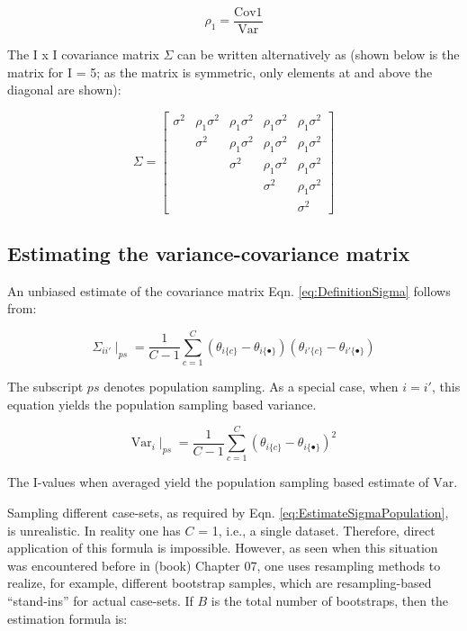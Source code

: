 \documentclass[
]{book}
\begin{document}
\[\rho_1=\frac{\text{Cov1}}{\text{Var}}\]

The I x I covariance matrix \(\Sigma\) can be written alternatively as (shown below is the matrix for I = 5; as the matrix is symmetric, only elements at and above the diagonal are shown):

\begin{equation}
\Sigma = 
\begin{bmatrix}
\sigma^2 & \rho_1\sigma^2 & \rho_1\sigma^2 & \rho_1\sigma^2 & \rho_1\sigma^2\\
& \sigma^2 & \rho_1\sigma^2 & \rho_1\sigma^2 & \rho_1\sigma^2\\
&  & \sigma^2 & \rho_1\sigma^2 & \rho_1\sigma^2\\
&  &  & \sigma^2 & \rho_1\sigma^2\\
&  &  &  & \sigma^2
\end{bmatrix}
\label{eq:CovMtrxSigmaRhoForm}
\end{equation}

\hypertarget{estimating-the-variance-covariance-matrix}{%
\subsection{Estimating the variance-covariance matrix}\label{estimating-the-variance-covariance-matrix}}

An unbiased estimate of the covariance matrix Eqn. \eqref{eq:DefinitionSigma} follows from:

\begin{equation}
\Sigma_{ii'}\mid_{ps}=\frac{1}{C-1}\sum_{c=1}^{C} \left ( \theta_{i\{c\}} - \theta_{i\{\bullet\}} \right) \left ( \theta_{i'\{c\}} - \theta_{i'\{\bullet\}} \right)
\label{eq:EstimateSigmaPopulation}
\end{equation}

The subscript \(ps\) denotes population sampling. As a special case, when \(i = i'\), this equation yields the population sampling based variance.

\begin{equation}
\text{Var}_{i}\mid_{ps}=\frac{1}{C-1}\sum_{c=1}^{C} \left ( \theta_{i\{c\}} - \theta_{i\{\bullet\}} \right)^2
\label{eq:EstimateVarPopulation}
\end{equation}

The I-values when averaged yield the population sampling based estimate of \(\text{Var}\).

Sampling different case-sets, as required by Eqn. \eqref{eq:EstimateSigmaPopulation}, is unrealistic. In reality one has \(C\) = 1, i.e., a single dataset. Therefore, direct application of this formula is impossible. However, as seen when this situation was encountered before in (book) Chapter 07, one uses resampling methods to realize, for example, different bootstrap samples, which are resampling-based ``stand-ins'' for actual case-sets. If \(B\) is the total number of bootstraps, then the estimation formula is:
\end{document}
